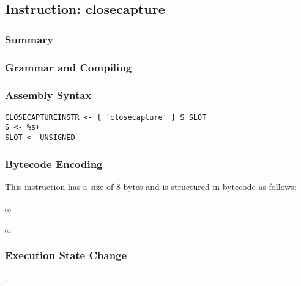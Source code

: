 \subsection{Instruction: closecapture}

\subsubsection{Summary}


\subsubsection{Grammar and Compiling}


\subsubsection{Assembly Syntax}

\begin{myquote}
\begin{verbatim}
CLOSECAPTUREINSTR <- { 'closecapture' } S SLOT
S <- %s+
SLOT <- UNSIGNED
\end{verbatim}
\end{myquote}

\subsubsection{Bytecode Encoding}

This instruction has a size of 8 bytes and is structured in bytecode as follows:

$_{00}$\ 



$_{04}$\ 


\subsubsection{Execution State Change}

.


